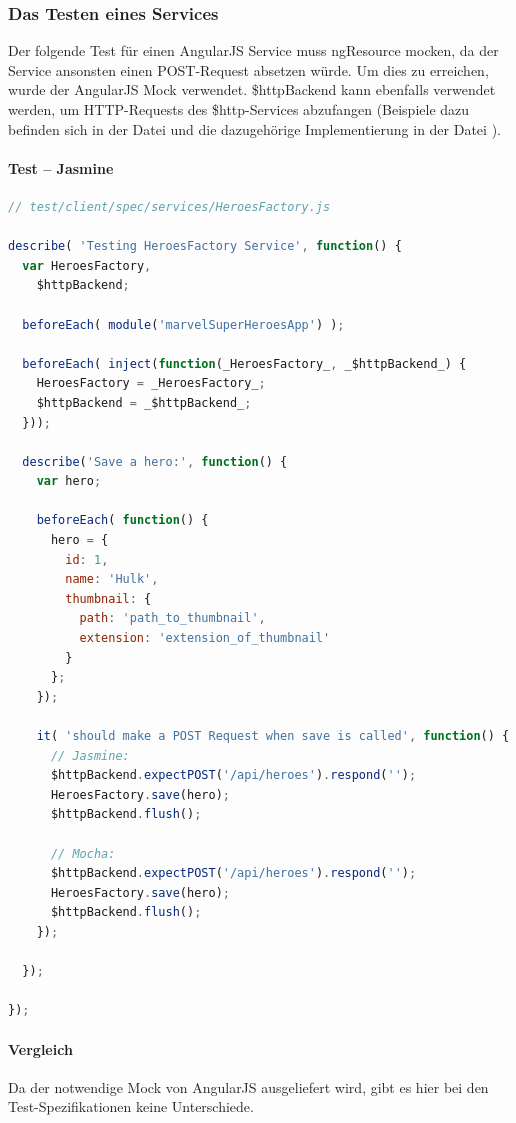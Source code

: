 \newpage
\subsubsection{Das Testen eines Services}
Der folgende Test für einen AngularJS Service  muss ngResource mocken, da der Service ansonsten einen POST-Request absetzen würde. Um dies zu erreichen, wurde der AngularJS Mock  verwendet. \$httpBackend kann ebenfalls verwendet werden, um HTTP-Requests des \$http-Services abzufangen (Beispiele dazu befinden sich in der Datei  und die dazugehörige Implementierung in der Datei ).

\paragraph{Test -- Jasmine}
\begin{lstlisting}[language=JavaScript, caption=TDD AngularJS - Service]
// test/client/spec/services/HeroesFactory.js

describe( 'Testing HeroesFactory Service', function() {
  var HeroesFactory,
    $httpBackend;

  beforeEach( module('marvelSuperHeroesApp') );

  beforeEach( inject(function(_HeroesFactory_, _$httpBackend_) {
    HeroesFactory = _HeroesFactory_;
    $httpBackend = _$httpBackend_;
  }));

  describe('Save a hero:', function() {
    var hero;

    beforeEach( function() {
      hero = {
        id: 1,
        name: 'Hulk',
        thumbnail: {
          path: 'path_to_thumbnail',
          extension: 'extension_of_thumbnail'
        }
      };
    });

    it( 'should make a POST Request when save is called', function() {
      // Jasmine:
      $httpBackend.expectPOST('/api/heroes').respond('');
      HeroesFactory.save(hero);
      $httpBackend.flush();

      // Mocha:
      $httpBackend.expectPOST('/api/heroes').respond('');
      HeroesFactory.save(hero);
      $httpBackend.flush();
    });

  });

});

\end{lstlisting}

\paragraph{Vergleich}
Da der notwendige Mock von AngularJS ausgeliefert wird, gibt es hier bei den Test-Spezifikationen keine Unterschiede.

